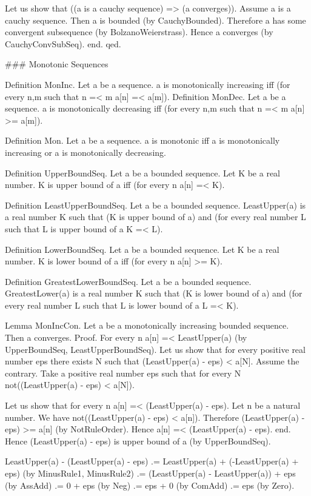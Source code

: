 \documentclass{article}
\newenvironment{forthel}{\begin{leftbar}}{\end{leftbar}}
\begin{document}
\begin{forthel}
	Let us show that ((a is a cauchy sequence) => (a converges)).
	Assume a is a cauchy sequence.
	Then a is bounded (by CauchyBounded).
	Therefore a has some convergent subsequence (by BolzanoWeierstrass).
	Hence a converges (by CauchyConvSubSeq).
	end.
	qed.
	
	
	
	### Monotonic Sequences
	
	Definition MonInc.
	Let a be a sequence. a is monotonically increasing iff (for every n,m such that n =< m a[n] =< a[m]).
	Definition MonDec.
	Let a be a sequence. a is monotonically decreasing iff (for every n,m such that n =< m a[n] >= a[m]).
	
	Definition Mon.
	Let a be a sequence. a is monotonic iff a is monotonically increasing or a is monotonically decreasing.
	
	Definition UpperBoundSeq.
	Let a be a bounded sequence. Let K be a real number. K is upper bound of a iff (for every n a[n] =< K).
	
	Definition LeastUpperBoundSeq.
	Let a be a bounded sequence. LeastUpper(a) is a real number K such that (K is upper bound of a) and 
	(for every real number L such that L is upper bound of a K =< L).
	
	Definition LowerBoundSeq.
	Let a be a bounded sequence. Let K be a real number. K is lower bound of a iff (for every n a[n] >= K).
	
	Definition GreatestLowerBoundSeq.
	Let a be a bounded sequence. GreatestLower(a) is a real number K such that (K is lower bound of a) and
	(for every real number L such that L is lower bound of a L =< K).
	
	Lemma MonIncCon.
	Let a be a monotonically increasing bounded sequence. Then a converges.
	Proof.
	For every n a[n] =< LeastUpper(a) (by UpperBoundSeq, LeastUpperBoundSeq).
	Let us show that for every positive real number eps there exists N such that (LeastUpper(a) - eps) < a[N].
	Assume the contrary.
	Take a positive real number eps such that for every N not((LeastUpper(a) - eps) < a[N]).
	
	Let us show that for every n a[n] =< (LeastUpper(a) - eps).
	Let n be a natural number.
	We have not((LeastUpper(a) - eps) < a[n]).
	Therefore (LeastUpper(a) - eps) >= a[n] (by NotRuleOrder).
	Hence a[n] =< (LeastUpper(a) - eps).
	end.
	Hence (LeastUpper(a) - eps) is upper bound of a (by UpperBoundSeq).
	
	LeastUpper(a) - (LeastUpper(a) - eps) .= LeastUpper(a) + (-LeastUpper(a) + eps) (by MinusRule1, MinusRule2)
	.= (LeastUpper(a) - LeastUpper(a)) + eps (by AssAdd)
	.= 0 + eps (by Neg)
	.= eps + 0 (by ComAdd)
	.= eps (by Zero).
	

\end{forthel}
\end{document}
